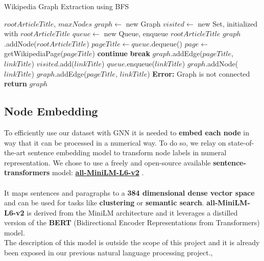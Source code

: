 \documentclass[11pt]{article}
\begin{document}
	\begin{algorithm}
		\caption{Wikipedia Graph Extraction using BFS}
		\begin{algorithmic}[1]
			\Require $rootArticleTitle$, $maxNodes$
			\State $graph \gets$ new Graph
			\State $visited \gets$ new Set, initialized with $rootArticleTitle$
			\State $queue \gets$ new Queue, enqueue $rootArticleTitle$
			\State $graph$.addNode($rootArticleTitle$)
			\State $pageTitle \gets queue$.dequeue()
			\State $page \gets$ getWikipediaPage($pageTitle$) 
			\State \textbf{continue} 
			\EndIf
			\State \textbf{break} 
			\EndIf
			\State $graph$.addEdge($pageTitle$, $linkTitle$)
			\Else
			\State $visited$.add($linkTitle$)
			\State $queue$.enqueue($linkTitle$)
			\State $graph$.addNode($linkTitle$)
			\State $graph$.addEdge($pageTitle$, $linkTitle$)
			\EndIf
			\EndFor
			\EndWhile
			\State \textbf{Error:} Graph is not connected
			\EndIf
			\State \textbf{return} $graph$
		\end{algorithmic}
		\label{alg_1}
	\end{algorithm}
	
	\subsection{Node Embedding}
	\label{node_embedding}
	To efficiently use our dataset with GNN it is needed to \textbf{embed each node} in way that it can be processed in a numerical way. To do so, we relay on state-of-the-art sentence embedding model to transform node labels in numeral representation.
	We chose to use a freely and open-source available \textbf{sentence-transformers} model: \textbf{\href{https://huggingface.co/sentence-transformers/all-MiniLM-L6-v2}{all-MiniLM-L6-v2}} \cite{reimers-2019-sentence-bert}. \\\\
	It maps sentences and paragraphs to a \textbf{384 dimensional dense vector space} and can be used for tasks like \textbf{clustering} or \textbf{semantic search}.
	\textbf{all-MiniLM-L6-v2} is derived from the MiniLM \cite{wang2020minilmdeepselfattentiondistillation} architecture and it leverages a distilled version of the \textbf{BERT} (Bidirectional Encoder Representations from Transformers) \cite{devlin2019bertpretrainingdeepbidirectional} model.\\
	The description of this model is outside the scope of this project and it is already been exposed in our previous natural language processing project.,
	
\end{document}
